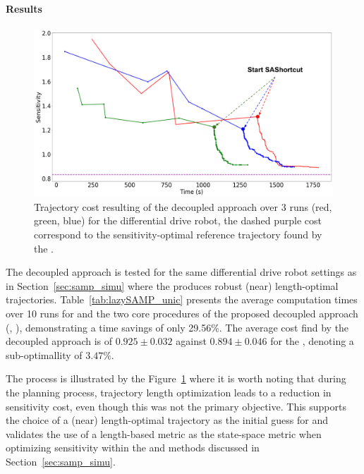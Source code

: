 \paragraph{Results}



\begin{figure}[htp]
    \centering
    \includegraphics[width=0.7\linewidth]{figures/samp/sensi_cost_unic.png}
    \caption{Trajectory cost resulting of the decoupled approach over 3 runs (red, green, blue) for the differential drive robot, the dashed purple cost correspond to the sensitivity-optimal reference trajectory found by the .}
    \label{fig:sensi_cost_unic}
\end{figure}

The decoupled approach is tested for the same differential drive robot settings as in Section~\ref{sec:samp_simu} where the  produces robust (near) length-optimal trajectories.
Table~\ref{tab:lazySAMP_unic} presents the average computation times over 10 runs for  and the two core procedures of the proposed decoupled approach (, ), demonstrating a time savings of only 29.56\%.
The average cost find by the decoupled approach is of $0.925 \pm 0.032$ against $0.894 \pm 0.046$ for the , denoting a sub-optimallity of $3.47\%$.

The process is illustrated by the Figure~\ref{fig:sensi_cost_unic} where it is worth noting that during the  planning process, trajectory length optimization leads to a reduction in sensitivity cost, even though this was not the primary objective. 
This supports the choice of a (near) length-optimal trajectory as the initial guess for  and validates the use of a length-based metric as the state-space metric when optimizing sensitivity within the  and  methods discussed in Section~\ref{sec:samp_simu}.

